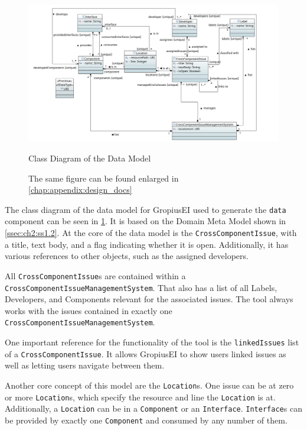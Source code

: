 \begin{figure}[!h]
	\centering
	\includegraphics[width=\textwidth]{graphics/dataClassDiagram.png}
	\caption{Class Diagram of the Data Model}
	\caption*{\footnotesize{The same figure can be found enlarged in \cref{chap:appendix:design_docs}}}
	\label{fig:c4:data_class_diagram}
\end{figure}
The class diagram of the data model for \gls{GropiusEI} used to generate the \lstinline|data| component can be seen in \cref{fig:c4:data_class_diagram}.
It is based on the Domain Meta Model shown in \cref{ssec:ch2:ss1.2}.
At the core of the data model is the \lstinline|CrossComponentIssue|, with a title, text body, and a flag indicating whether it is open.
Additionally, it has various references to other objects, such as the assigned developers.

All \lstinline|CrossComponentIssue|s are contained within a \lstinline|CrossComponentIssueManagementSystem|.
That also has a list of all Labels, Developers, and Components relevant for the associated issues.
The tool always works with the issues contained in exactly one \lstinline|CrossComponentIssueManagementSystem|.

One important reference for the functionality of the tool is the \lstinline|linkedIssues| list of a \lstinline|CrossComponentIssue|.
It allows \gls{GropiusEI} to show users linked issues as well as letting users navigate between them.

Another core concept of this model are the \lstinline|Location|s.
One issue can be at zero or more \lstinline|Location|s, which specify the resource and line the \lstinline|Location| is at.
Additionally, a \lstinline|Location| can be in a \lstinline|Component| or an \lstinline|Interface|.
\lstinline|Interface|s can be provided by exactly one \lstinline|Component| and consumed by any number of them.

